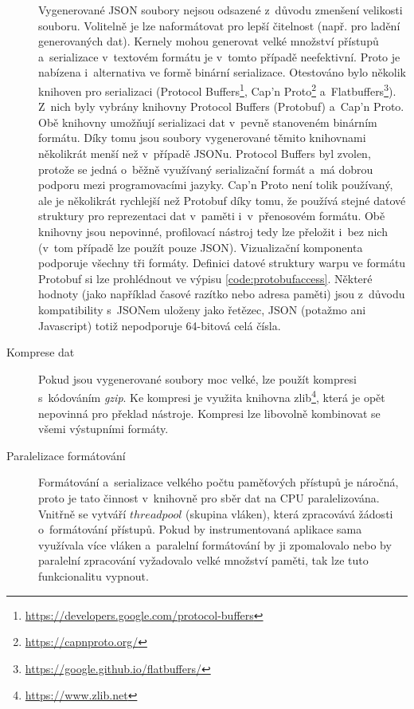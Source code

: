 \begin{description}
    Vygenerované JSON soubory nejsou odsazené z~důvodu zmenšení velikosti souboru. Volitelně je lze naformátovat pro lepší čitelnost (např. pro ladění generovaných dat). Kernely mohou generovat velké množství přístupů a~serializace v~textovém formátu je v~tomto případě neefektivní. Proto je nabízena i~alternativa ve formě binární serializace. Otestováno bylo několik knihoven pro serializaci (Protocol Buffers\footnote{\url{https://developers.google.com/protocol-buffers}}, Cap'n Proto\footnote{\url{https://capnproto.org/}} a~Flatbuffers\footnote{\url{https://google.github.io/flatbuffers/}}). Z~nich byly vybrány knihovny Protocol Buffers (Protobuf) a~Cap'n Proto. Obě knihovny umožňují serializaci dat v~pevně stanoveném binárním formátu. Díky tomu jsou soubory vygenerované těmito knihovnami několikrát menší než v~případě JSONu. Protocol Buffers byl zvolen, protože se jedná o~běžně využívaný serializační formát a~má dobrou podporu mezi programovacími jazyky. Cap'n Proto není tolik používaný, ale je několikrát rychlejší než Protobuf díky tomu, že používá stejné datové struktury pro reprezentaci dat v~paměti i~v~přenosovém formátu. Obě knihovny jsou nepovinné, profilovací nástroj tedy lze přeložit i~bez nich (v~tom případě lze použít pouze JSON). Vizualizační komponenta podporuje všechny tři formáty. Definici datové struktury warpu ve formátu Protobuf si lze prohlédnout ve výpisu \ref{code:protobufaccess}. Některé hodnoty (jako například časové razítko nebo adresa paměti) jsou z~důvodu kompatibility s~JSONem uloženy jako řetězec, JSON (potažmo ani Javascript) totiž nepodporuje 64-bitová celá čísla.
    \item[Komprese dat] Pokud jsou vygenerované soubory moc velké, lze použít kompresi s~kódováním \emph{gzip}. Ke kompresi je využita knihovna zlib\footnote{\url{https://www.zlib.net}}, která je opět nepovinná pro překlad nástroje. Kompresi lze libovolně kombinovat se všemi výstupními formáty.
    \item[Paralelizace formátování] Formátování a~serializace velkého počtu paměťových přístupů je náročná, proto je tato činnost v~knihovně pro sběr dat na CPU paralelizována. Vnitřně se vytváří $thread pool$ (skupina vláken), která zpracovává žádosti o~formátování přístupů. Pokud by instrumentovaná aplikace sama využívala více vláken a~paralelní formátování by ji zpomalovalo nebo by paralelní zpracování vyžadovalo velké množství paměti, tak lze tuto funkcionalitu vypnout.
\end{description}
